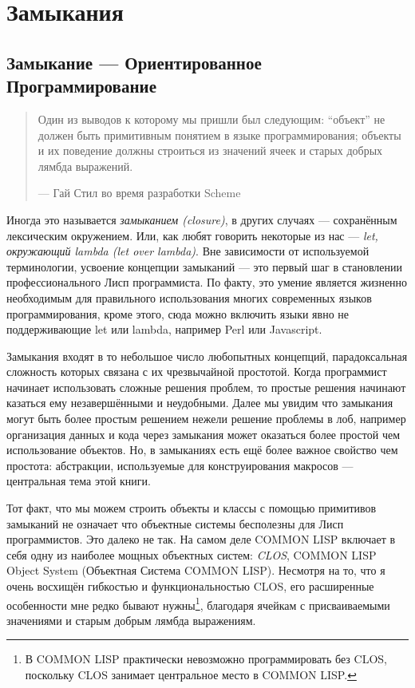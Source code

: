 \chapter{Замыкания}\label{chapter_closures}
\section{Замыкание --- Ориентированное Программирование}\label{section_closure-oriented_programming}
\begin{quote}
Один из выводов к которому мы пришли был следующим: ``объект'' не должен быть примитивным понятием в языке программирования; объекты и их поведение должны строиться из значений ячеек и старых добрых лямбда выражений.

--- Гай Стил во время разработки Scheme
\end{quote}

Иногда это называется \emph{замыканием (closure)}, в других случаях --- сохранённым лексическим окружением. Или, как любят говорить некоторые из нас --- \emph{let, окружающий lambda (let over lambda)}. Вне зависимости от используемой терминологии, усвоение концепции замыканий --- это первый шаг в становлении профессионального Лисп программиста. По факту, это умение является жизненно необходимым для правильного использования многих современных языков программирования, кроме этого, сюда можно включить языки явно не поддерживающие let или lambda, например Perl или Javascript.

Замыкания входят в то небольшое число любопытных концепций, парадоксальная сложность которых связана с их чрезвычайной простотой. Когда программист начинает использовать сложные решения проблем, то простые решения начинают казаться ему незавершёнными и неудобными. Далее мы увидим что замыкания могут быть более простым решением нежели решение проблемы в лоб, например организация данных и кода через замыкания может оказаться более простой чем использование объектов. Но, в замыканиях есть ещё более важное свойство чем простота: абстракции, используемые для конструирования макросов --- центральная тема этой книги.

Тот факт, что мы можем строить объекты и классы с помощью примитивов замыканий не означает что объектные системы бесполезны для Лисп программистов. Это далеко не так. На самом деле COMMON LISP включает в себя одну из наиболее мощных объектных систем: \emph{CLOS}, COMMON LISP Object System (Объектная Система COMMON LISP). Несмотря на то, что я очень восхищён гибкостью и функциональностью CLOS, его расширенные особенности мне редко бывают нужны\footnote{В COMMON LISP практически невозможно программировать без CLOS, поскольку CLOS занимает центральное место в COMMON LISP.}, благодаря ячейкам с присваиваемыми значениями и старым добрым лямбда выражениям.

